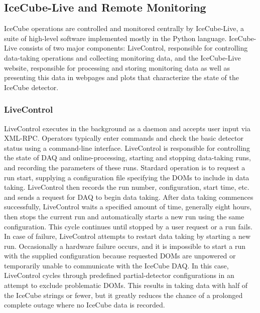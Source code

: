 \subsection{IceCube-Live and Remote Monitoring}

IceCube operations are controlled and monitored centrally by IceCube-Live, a suite of high-level software implemented mostly in the Python language.
IceCube-Live consists of two major components: LiveControl, responsible for controlling data-taking operations and
collecting monitoring data, and the IceCube-Live website, responsible for processing and storing monitoring data as well as presenting this data
in webpages and plots that characterize the state of the IceCube detector.

\subsubsection{LiveControl}

LiveControl executes in the background as a daemon and accepts user input via XML-RPC.
Operators typically enter commands and check the basic detector status using a command-line interface.  LiveControl is
responsible for controlling the state of DAQ and online-processing, starting and stopping data-taking runs, and recording
the parameters of these runs.  Stardard operation is to request a run start, supplying a configuration file specifying the DOMs to include in
data taking.  LiveControl then records the run number, configuration, start time, etc. and sends a request for DAQ to
begin data taking.  After data taking commences successfully, LiveControl waits a specified amount of time, generally eight
hours, then stops the current run and automatically starts a new run using the same configuration.  This cycle continues until
stopped by a user request or a run fails.  In case of failure, LiveControl attempts to restart data taking by starting a new
run.  Occasionally a hardware failure occurs, and it is impossible to start a run with the supplied configuration because requested DOMs are
unpowered or temporarily unable to communicate with the IceCube DAQ.  In this case, LiveControl cycles through predefined partial-detector
configurations in an attempt to exclude problematic DOMs.  This results in taking data with half of the IceCube strings or fewer, but it
greatly reduces the chance of a prolonged complete outage where no IceCube data is recorded.

